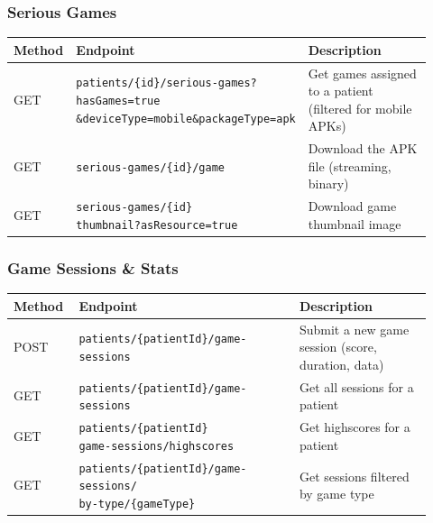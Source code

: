 \subsubsection{Serious Games}\label{serious-games}

\begin{longtable}{p{0.12\linewidth}p{0.50\linewidth}p{0.30\linewidth}}
\toprule
Method & Endpoint & Description \\
\midrule
\endhead
\bottomrule
\endlastfoot
GET &
\parbox[t]{\linewidth}{
\texttt{patients/\{id\}/serious-games?hasGames=true}\\
\texttt{\&deviceType=mobile\&packageType=apk}
}
&
Get games assigned to a patient (filtered for mobile APKs) \\
GET &
\parbox[t]{\linewidth}{\texttt{serious-games/\{id\}/game}}
&
Download the APK file (streaming, binary) \\
GET &
\parbox[t]{\linewidth}{\texttt{serious-games/\{id\}\\
\texttt{\/thumbnail?asResource=true}}}
&
Download game thumbnail image \\
\end{longtable}

\subsubsection{Game Sessions \& Stats}\label{game-sessions-stats}

\begin{longtable}{p{0.12\linewidth}p{0.50\linewidth}p{0.30\linewidth}}
\toprule
Method & Endpoint & Description \\
\midrule
\endhead
\bottomrule
\endlastfoot
POST &
\parbox[t]{\linewidth}{\texttt{patients/\{patientId\}/game-sessions}}
&
Submit a new game session (score, duration, data) \\
GET &
\parbox[t]{\linewidth}{\texttt{patients/\{patientId\}/game-sessions}}
&
Get all sessions for a patient \\
GET &
\parbox[t]{\linewidth}{\texttt{patients/\{patientId\}\\
\texttt{\/game-sessions/highscores}}}
&
Get highscores for a patient \\
GET &
\parbox[t]{\linewidth}{
\texttt{patients/\{patientId\}/game-sessions/}\\
\texttt{by-type/\{gameType\}}
}
&
Get sessions filtered by game type \\
\end{longtable}

